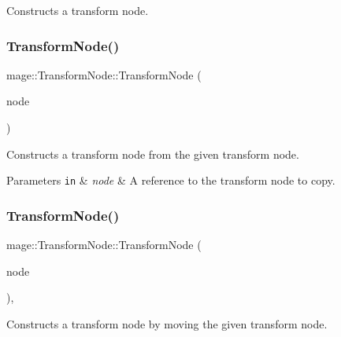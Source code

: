 Constructs a transform node. \hypertarget{structmage_1_1_transform_node_a33ae343355c328a543b8665f7f1e9c3f}{}\label{structmage_1_1_transform_node_a33ae343355c328a543b8665f7f1e9c3f} 
\subsubsection{\texorpdfstring{Transform\+Node()}{TransformNode()}\hspace{0.1cm}{\footnotesize\ttfamily [2/3]}}
{\footnotesize\ttfamily mage\+::\+Transform\+Node\+::\+Transform\+Node (\begin{DoxyParamCaption}\item[{const \hyperlink{structmage_1_1_transform_node}{Transform\+Node} \&}]{node }\end{DoxyParamCaption})\hspace{0.3cm}{\ttfamily [private]}}

Constructs a transform node from the given transform node.


\begin{DoxyParams}[1]{Parameters}
\mbox{\tt in}  & {\em node} & A reference to the transform node to copy. \\
\hline
\end{DoxyParams}
\hypertarget{structmage_1_1_transform_node_aff227d1925614bc5afc03c981bc2a717}{}\label{structmage_1_1_transform_node_aff227d1925614bc5afc03c981bc2a717} 
\subsubsection{\texorpdfstring{Transform\+Node()}{TransformNode()}\hspace{0.1cm}{\footnotesize\ttfamily [3/3]}}
{\footnotesize\ttfamily mage\+::\+Transform\+Node\+::\+Transform\+Node (\begin{DoxyParamCaption}\item[{\hyperlink{structmage_1_1_transform_node}{Transform\+Node} \&\&}]{node }\end{DoxyParamCaption})\hspace{0.3cm}{\ttfamily [private]}, {\ttfamily [noexcept]}}

Constructs a transform node by moving the given transform node.



